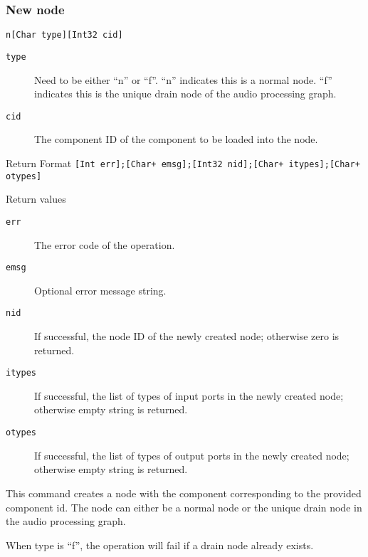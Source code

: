 \documentclass{report}
\newcommand{\inlinecode}[1]{\begin{mdframed}[backgroundcolor=black!10]#1\end{mdframed}}
\begin{document}
\subsubsection{New node}
\inlinecode{
\begin{description}\sloppy
\item[Command Format] \lstinline{n[Char type][Int32 cid]}
\item[Command Arguments]\hfill
  \begin{description}
  \item[\texttt{type}] Need to be either ``n'' or ``f''. ``n'' indicates this is a normal node. ``f'' indicates this is the unique drain node of the audio processing graph.
  \item[\texttt{cid}] The component ID of the component to be loaded into the node.
  \end{description}
\item[Return Format] \lstinline|[Int err];[Char+ emsg];[Int32 nid];[Char+ itypes];[Char+ otypes]|
\item[Return values]\hfill
  \begin{description}
  \item[\texttt{err}] The error code of the operation.
  \item[\texttt{emsg}] Optional error message string.
  \item[\texttt{nid}] If successful, the node ID of the newly created node; otherwise zero is returned.
  \item[\texttt{itypes}] If successful, the list of types of input ports in the newly created node; otherwise empty string is returned.
  \item[\texttt{otypes}] If successful, the list of types of output ports in the newly created node; otherwise empty string is returned.
  \end{description}
\end{description}}\par
This command creates a node with the component corresponding to the provided component id. The node can either be a normal node or the unique drain node in the audio processing graph.\par
When type is ``f'', the operation will fail if a drain node already exists.
\end{document}
